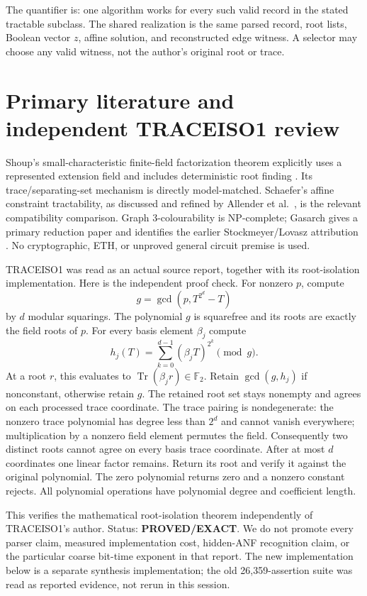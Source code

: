 \documentclass[11pt]{article}
\newcommand{\F}{\mathbb F}
\newcommand{\EXACT}{\textbf{PROVED/EXACT}}
\begin{document}
The quantifier is: one algorithm works for every such valid record in the
stated tractable subclass. The shared realization is the same parsed record,
root lists, Boolean vector $z$, affine solution, and reconstructed edge
witness. A selector may choose any valid witness, not the author's original
root or trace.

\section{Primary literature and independent TRACEISO1 review}
Shoup's small-characteristic finite-field factorization theorem explicitly
uses a represented extension field and includes deterministic root finding
\cite{shoup}. Its trace/separating-set mechanism is directly model-matched.
Schaefer's affine constraint tractability, as discussed and refined by
Allender et al.\ \cite{allender}, is the relevant compatibility comparison.
Graph 3-colourability is NP-complete; Gasarch gives a primary reduction paper
and identifies the earlier Stockmeyer/Lovasz attribution \cite{gasarch}.
No cryptographic, ETH, or unproved general circuit premise is used.

TRACEISO1 was read as an actual source report, together with its root-isolation
implementation. Here is the independent proof check. For nonzero $p$, compute
\[
 g=\gcd(p,T^{2^d}-T)
\]
by $d$ modular squarings. The polynomial $g$ is squarefree and its roots are
exactly the field roots of $p$. For every basis element $\beta_j$ compute
\[
 h_j(T)=\sum_{k=0}^{d-1}(\beta_j T)^{2^k}\pmod g.
\]
At a root $r$, this evaluates to $\operatorname{Tr}(\beta_jr)\in\F_2$.
Retain $\gcd(g,h_j)$ if nonconstant, otherwise retain $g$. The retained root
set stays nonempty and agrees on each processed trace coordinate.
The trace pairing is nondegenerate: the nonzero trace polynomial has degree
less than $2^d$ and cannot vanish everywhere; multiplication by a nonzero
field element permutes the field. Consequently two distinct roots cannot
agree on every basis trace coordinate. After at most $d$ coordinates one
linear factor remains. Return its root and verify it against the original
polynomial. The zero polynomial returns zero and a nonzero constant rejects.
All polynomial operations have polynomial degree and coefficient length.

This verifies the mathematical root-isolation theorem independently of
TRACEISO1's author. Status: \EXACT{}. We do not promote every parser claim,
measured implementation cost, hidden-ANF recognition claim, or the particular
coarse bit-time exponent in that report. The new implementation below is a
separate synthesis implementation; the old 26,359-assertion suite was read as
reported evidence, not rerun in this session.
\end{document}
